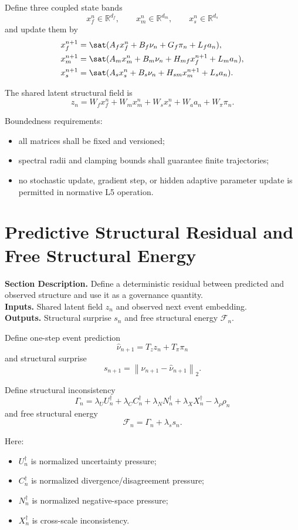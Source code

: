 \documentclass[11pt]{report}
\newcommand{\R}{\mathbb{R}}
\newcommand{\norm}[1]{\left\lVert #1 \right\rVert}
\newcommand{\meta}[3]{\textbf{Section Description.} #1\\
\textbf{Inputs.} #2\\
\textbf{Outputs.} #3\par}
\begin{document}
Define three coupled state bands
\[
x_f^n\in\R^{d_f},\qquad x_m^n\in\R^{d_m},\qquad x_s^n\in\R^{d_s}
\]
and update them by
\begin{align*}
x_f^{n+1} &= \sat(A_f x_f^n + B_f\nu_n + G_f\pi_n + L_f a_n),\\
x_m^{n+1} &= \sat(A_m x_m^n + B_m\nu_n + H_{mf}x_f^{n+1} + L_m a_n),\\
x_s^{n+1} &= \sat(A_s x_s^n + B_s\nu_n + H_{sm}x_m^{n+1} + L_s a_n).
\end{align*}

The shared latent structural field is
\[
z_n = W_f x_f^n + W_m x_m^n + W_s x_s^n + W_a a_n + W_\pi \pi_n.
\]

Boundedness requirements:
\begin{itemize}
    \item all matrices shall be fixed and versioned;
    \item spectral radii and clamping bounds shall guarantee finite trajectories;
    \item no stochastic update, gradient step, or hidden adaptive parameter update is permitted in normative L5 operation.
\end{itemize}

\section{Predictive Structural Residual and Free Structural Energy}
\meta{Define a deterministic residual between predicted and observed structure and use it as a governance quantity.}{Shared latent field $z_n$ and observed next event embedding.}{Structural surprise $s_n$ and free structural energy $\mathcal{F}_n$.}

Define one-step event prediction
\[
\hat \nu_{n+1} = T_z z_n + T_\pi \pi_n
\]
and structural surprise
\[
s_{n+1} = \norm{\nu_{n+1}-\hat \nu_{n+1}}_2.
\]

Define structural inconsistency
\[
\Gamma_n = \lambda_U U_n^{\dagger} + \lambda_C C_n^{\dagger} + \lambda_N N_n^{\dagger} + \lambda_X X_n^{\dagger} - \lambda_\rho \rho_n
\]
and free structural energy
\[
\mathcal{F}_n = \Gamma_n + \lambda_s s_n.
\]

Here:
\begin{itemize}
    \item $U_n^{\dagger}$ is normalized uncertainty pressure;
    \item $C_n^{\dagger}$ is normalized divergence/disagreement pressure;
    \item $N_n^{\dagger}$ is normalized negative-space pressure;
    \item $X_n^{\dagger}$ is cross-scale inconsistency.
\end{itemize}
\end{document}
